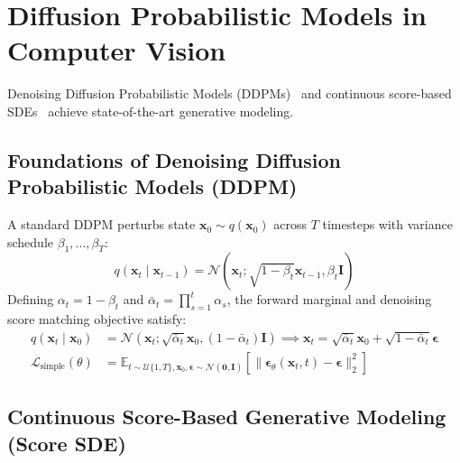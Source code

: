 \section{Diffusion Probabilistic Models in Computer Vision}
\label{sec:lit_diffusion_models}

Denoising Diffusion Probabilistic Models (DDPMs)~\cite{ho2020denoising} and continuous score-based SDEs~\cite{song2020score} achieve state-of-the-art generative modeling.

\subsection{Foundations of Denoising Diffusion Probabilistic Models (DDPM)}
\label{subsec:ddpm_theory}

A standard DDPM perturbs state $\mathbf{x}_0 \sim q(\mathbf{x}_0)$ across $T$ timesteps with variance schedule $\beta_1, \dots, \beta_T$:
\begin{equation}
\label{eq:lit_ddpm_forward_step}
q(\mathbf{x}_t \mid \mathbf{x}_{t-1}) = \mathcal{N}\left(\mathbf{x}_t; \sqrt{1 - \beta_t}\mathbf{x}_{t-1}, \beta_t \mathbf{I}\right)
\end{equation}
Defining $\alpha_t = 1 - \beta_t$ and $\bar{\alpha}_t = \prod_{s=1}^t \alpha_s$, the forward marginal and denoising score matching objective satisfy:
\begin{align}
\label{eq:lit_ddpm_marginal}
q(\mathbf{x}_t \mid \mathbf{x}_0) &= \mathcal{N}\left(\mathbf{x}_t; \sqrt{\bar{\alpha}_t}\mathbf{x}_0, (1 - \bar{\alpha}_t)\mathbf{I}\right) \implies \mathbf{x}_t = \sqrt{\bar{\alpha}_t}\mathbf{x}_0 + \sqrt{1 - \bar{\alpha}_t}\boldsymbol{\epsilon} \\
\label{eq:lit_ddpm_loss}
\mathcal{L}_{\text{simple}}(\theta) &= \mathbb{E}_{t \sim \mathcal{U}\{1, T\}, \mathbf{x}_0, \boldsymbol{\epsilon} \sim \mathcal{N}(\mathbf{0}, \mathbf{I})}\left[\|\boldsymbol{\epsilon}_\theta(\mathbf{x}_t, t) - \boldsymbol{\epsilon}\|_2^2\right]
\end{align}

\subsection{Continuous Score-Based Generative Modeling (Score SDE)}
\label{subsec:score_sde}

